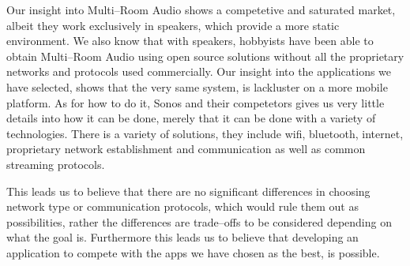 \bigskip
Our insight into Multi--Room Audio shows a competetive and saturated market, albeit they work exclusively in speakers, which provide a more static environment.
We also know that with speakers, hobbyists have been able to obtain Multi--Room Audio using open source solutions without all the proprietary networks and protocols used commercially.
Our insight into the applications we have selected, shows that the very same system, is lackluster on a more mobile platform.
As for how to do it, Sonos and their competetors gives us very little details into how it can be done, merely that it can be done with a variety of technologies.
There is a variety of solutions, they include wifi, bluetooth, internet, proprietary network establishment and communication as well as common streaming protocols.

This leads us to believe that there are no significant differences in choosing network type or communication protocols, which would rule them out as possibilities, rather the differences are trade--offs to be considered depending on what the goal is.
Furthermore this leads us to believe that developing an application to compete with the apps we have chosen as the best, is possible.



